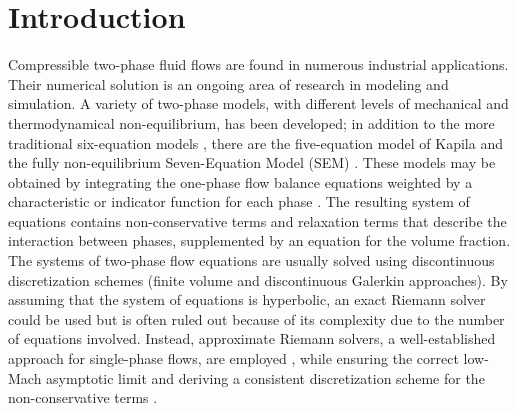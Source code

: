 \section{Introduction}\label{sec:intro}
%
Compressible two-phase fluid flows are found in numerous industrial applications. Their numerical solution is an ongoing area of research 
in modeling and simulation. 
A variety of two-phase models, with different levels of mechanical and thermodynamical non-equilibrium, has been developed;
in addition to the more traditional six-equation models \cite{Stadtke}, there are the five-equation model of Kapila \cite{Kapila_2001,GuillardMurrone2003,Saurel_2009} 
and the fully non-equilibrium Seven-Equation Model (SEM) \cite{Berry_1985,BaerNunziato,Saurel_2001b,SEM}.  These models may be obtained
by integrating the one-phase flow balance equations weighted by a characteristic or indicator function for each phase \cite{DrewPassman}.
The resulting system of equations contains non-conservative terms and relaxation terms that 
describe the interaction between phases, supplemented by an equation for the volume fraction. 
The systems of two-phase flow equations are usually solved using discontinuous discretization schemes (finite volume and discontinuous 
Galerkin approaches). By assuming that the system of equations is hyperbolic, an exact Riemann solver could be used but is often ruled 
out because of its complexity due to the number of equations involved. Instead, approximate Riemann solvers, a well-established approach 
for single-phase flows, are employed \cite{Saurel_2001a,Saurel_2001b,Li_2004,Zein_2010,Ambroso_2012},  while ensuring the correct 
low-Mach asymptotic limit and deriving a consistent discretization scheme for the non-conservative terms \cite{Li_2004,Abgrall_2002}.


